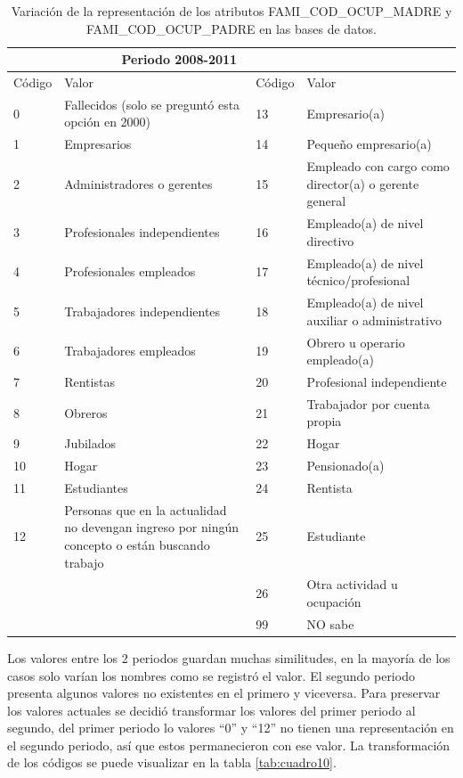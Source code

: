 \begin{itemize}
\begin{table}[!htb]
\centering
\begin{tabular}{|p{1.5cm}|p{6.5cm}|p{1.5cm}|p{6.5cm}|}
\hline
	\rowcolor[gray]{0.9} 
	\multicolumn{2}{|c|}{
	\textbf{Periodo 2000-2004I}} &
	\multicolumn{2}{|c|}{
	\textbf{Periodo 2008-2011}}\\
\hline
	\rowcolor[gray]{0.5}
	Código  & Valor &
	Código  & Valor \\
\hline
0 & Fallecidos (solo se preguntó esta opción en 2000) & 13 & Empresario(a)\\
\hline
1 & Empresarios & 14 & Pequeño empresario(a)\\
\hline
2 & Administradores o gerentes & 15 & Empleado con cargo como director(a) o gerente general\\
\hline
3 & Profesionales independientes & 16 & Empleado(a) de nivel directivo\\
\hline
4 & Profesionales empleados & 17 & Empleado(a) de nivel técnico/profesional\\
\hline
5 & Trabajadores independientes & 18 & Empleado(a) de nivel auxiliar o administrativo\\
\hline
6 & Trabajadores empleados & 19 & Obrero u operario empleado(a)\\
\hline
7 & Rentistas & 20 & Profesional independiente\\ 
\hline
8 & Obreros & 21 & Trabajador por cuenta propia\\
\hline
9 & Jubilados & 22 & Hogar\\
\hline
10 & Hogar & 23 & Pensionado(a)\\
\hline
11 & Estudiantes & 24 & Rentista\\
\hline
12 & Personas que en la actualidad no devengan ingreso por ningún concepto o están buscando trabajo & 25 & Estudiante\\
\hline
& & 26 & Otra actividad u ocupación\\
\hline
& & 99 & NO sabe\\
\hline
\end{tabular}
\caption{Variación de la representación de los atributos FAMI\_COD\_OCUP\_MADRE y FAMI\_COD\_OCUP\_PADRE en las bases de datos.}
\label{tab:cuadro9}
\end{table}
Los valores entre los 2 periodos guardan muchas similitudes, en la mayoría de los casos solo varían los nombres como se registró el valor. El segundo periodo presenta algunos valores no existentes en el primero y viceversa. Para preservar los valores actuales se decidió transformar los valores del primer periodo al segundo, del primer periodo lo valores ``0'' y ``12'' no tienen una representación en el segundo periodo, así que estos permanecieron con ese valor. La transformación de los códigos se puede visualizar en la tabla \ref{tab:cuadro10}.


\end{itemize}

